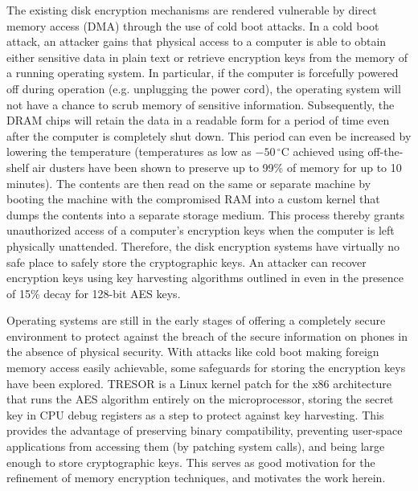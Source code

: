 \documentclass[conference,10pt]{IEEEtran}
\begin{document}
The existing disk encryption mechanisms are rendered vulnerable by direct memory access (DMA) 
through the use of cold boot attacks.  In a cold boot attack, an attacker gains that physical access 
to a computer is able to obtain either sensitive data in plain text or retrieve encryption keys from 
the memory of a running operating system.  In particular, if the computer is forcefully powered off 
during operation (e.g. unplugging the power cord), the operating system will not have a chance to 
scrub memory of sensitive information.  Subsequently, the DRAM chips will retain the data in a 
readable form for a period of time even after the computer is completely shut down.  This period can 
even be increased by lowering the temperature (temperatures as low as $-50\,^{\circ}\mathrm{C}$ 
achieved using off-the-shelf air dusters have been shown to preserve up to 99\% of memory for up to 
10 minutes).  The contents are then read on the same or separate machine by booting the machine with 
the compromised RAM into a custom kernel that dumps the contents into a separate storage medium. 
This process thereby grants unauthorized access of a computer's encryption keys when the computer is 
left physically unattended.  Therefore, the disk encryption systems have virtually no safe place to 
safely store the cryptographic keys.  An attacker can recover encryption keys using key harvesting 
algorithms outlined in \cite{coldboot} even in the presence of 15\% decay for 128-bit AES keys.

Operating systems are still in the early stages of offering a completely secure environment to 
protect against the breach of the secure information on phones in the absence of physical security.  
With attacks like cold boot making foreign memory access easily achievable, some safeguards for 
storing the encryption keys have been explored.  TRESOR \cite{tresor} is a Linux kernel patch for 
the x86 architecture that runs the AES algorithm entirely on the microprocessor, storing the secret 
key in CPU debug registers as a step to protect against key harvesting.  This provides the advantage 
of preserving binary compatibility, preventing user-space applications from accessing them (by 
patching system calls), and being large enough to store cryptographic keys.  This serves as good 
motivation for the refinement of memory encryption techniques, and motivates the work herein.
\end{document}
